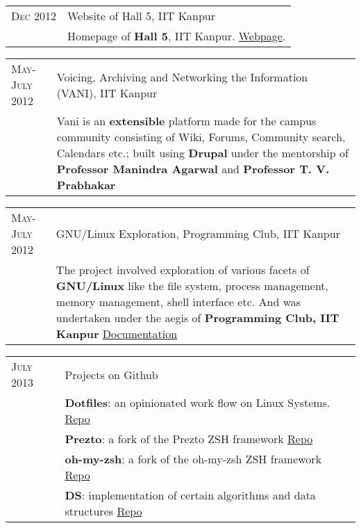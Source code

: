 \documentclass[a4paper,10pt]{article} %
\begin{document}
\begin{tabular}{p{2.2cm}|p{11cm}}
    \textsc{Dec 2012} & Website of Hall 5, IIT Kanpur\\
                      & \footnotesize{Homepage of \textbf{Hall 5}, IIT Kanpur.
                         \href{http://www.iitk.ac.in/hall5} {Webpage}. } \\
\end{tabular}

\begin{tabular}{p{2.2cm}|p{11cm}}
    \textsc{May-July 2012} & Voicing, Archiving and Networking the Information \textsc{(VANI)}, IIT Kanpur\\
                           & \footnotesize{Vani is an \textbf{extensible} platform
                              made for the campus community consisting of Wiki, Forums,
                              Community search, Calendars etc.; built using \textbf{Drupal}
                              under the mentorship of \textbf{Professor Manindra Agarwal} and
                              \textbf{Professor T. V. Prabhakar} } \\
\end{tabular}

\begin{tabular}{p{2.2cm}|p{11cm}}
    \textsc{May-July 2012} & GNU/Linux Exploration, Programming Club, IIT Kanpur\\
                           & \footnotesize{ The project involved exploration of various facets of
                             \textbf{GNU/Linux} like the file system, process management,
                             memory management, shell interface etc. And was
                             undertaken under the aegis of \textbf{Programming Club, IIT Kanpur}
                             \href{https://docs.google.com/document/d/1ZHO9w36aoq3oaZBR4Um1AOmDfiTDAEgM6baQAu3icw4/edit?usp=sharing}
                             {Documentation} } \\
\end{tabular}

\begin{tabular}{p{2.2cm}|p{11cm}}
    \textsc{July 2013} & Projects on Github \\
                       & \footnotesize{\textbf{Dotfiles}: an opinionated work flow on Linux Systems.
                          \href{https://github.com/srijanshetty/dotfiles} {Repo} } \\
                       & \footnotesize{\textbf{Prezto}: a fork of the Prezto ZSH framework
                          \href{https://github.com/srijanshetty/prezto} {Repo}} \\
                       & \footnotesize {\textbf{oh-my-zsh}: a fork of the oh-my-zsh ZSH framework
                          \href{https://github.com/srijanshetty/oh-my-zsh} {Repo} } \\
                       & \footnotesize{\textbf{DS}: implementation of certain algorithms and data structures
                          \href{https://github.com/srijanshetty/DS} {Repo}} \\
\end{tabular}
\end{document}
